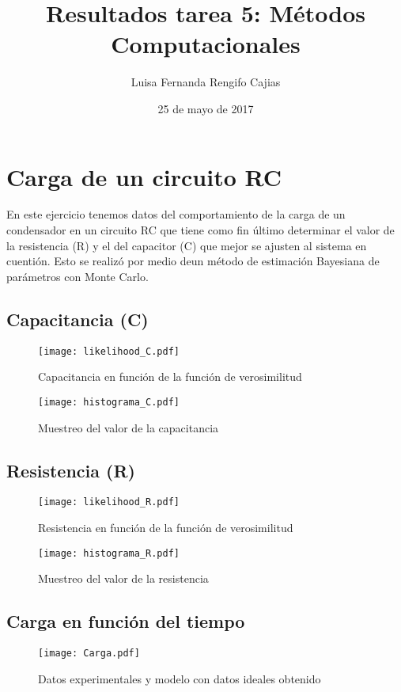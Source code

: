 \documentclass[a4paper]{article}
\title{Resultados tarea 5: M\'etodos Computacionales}
\author{Luisa Fernanda Rengifo Cajias}
\date{25 de mayo de 2017}
\begin{document}
\maketitle

\section{Carga de un circuito RC}
En este ejercicio tenemos datos del comportamiento de la carga de un condensador en un circuito RC que tiene como fin \'ultimo determinar el valor de la resistencia (R) y el del capacitor (C) que mejor se ajusten al sistema en cuenti\'on. Esto se realiz\'o por medio deun método de estimaci\'on Bayesiana de par\'ametros con Monte Carlo.

\subsection{Capacitancia (C)}

\begin{figure}[H]
\texttt{[image: likelihood\_C.pdf]}
\caption{Capacitancia en funci\'on de la funci\'on de verosimilitud}
\centering
\end{figure}

\begin{figure}[H]
\texttt{[image: histograma\_C.pdf]}
\caption{Muestreo del valor de la capacitancia}
\centering
\end{figure}


\subsection{Resistencia (R)}

\begin{figure}[H]
\texttt{[image: likelihood\_R.pdf]}
\caption{Resistencia en funci\'on de la funci\'on de verosimilitud}
\centering
\end{figure}

\begin{figure}[H]
\texttt{[image: histograma\_R.pdf]}
\caption{Muestreo del valor de la resistencia}
\centering
\end{figure}

\subsection{Carga en funci\'on del tiempo}

\begin{figure}[H]
\texttt{[image: Carga.pdf]}
\caption{Datos experimentales y modelo con datos ideales obtenido}
\centering
\end{figure}
\end{document}
